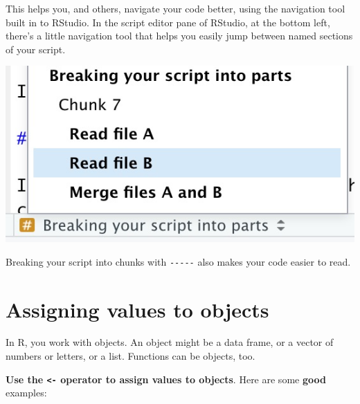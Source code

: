 \documentclass[]{book}
\newenvironment{Shaded}{\begin{snugshade}}{\end{snugshade}}
\newcommand{\KeywordTok}[1]{\textcolor[rgb]{0.13,0.29,0.53}{\textbf{#1}}}
\newcommand{\NormalTok}[1]{#1}
\newcommand{\OperatorTok}[1]{\textcolor[rgb]{0.81,0.36,0.00}{\textbf{#1}}}
\newcommand{\StringTok}[1]{\textcolor[rgb]{0.31,0.60,0.02}{#1}}
\begin{document}
This helps you, and others, navigate your code better, using the navigation tool built in to RStudio. In the script editor pane of RStudio, at the bottom left, there's a little navigation tool that helps you easily jump between named sections of your script.

\includegraphics[width=7.64in]{atlas/rstudio_navigation}

Breaking your script into chunks with \texttt{-\/-\/-\/-\/-} also makes your code easier to read.

\hypertarget{assigning-values-to-objects}{%
\section{Assigning values to objects}\label{assigning-values-to-objects}}

In R, you work with objects. An object might be a data frame, or a vector of numbers or letters, or a list. Functions can be objects, too.

\textbf{Use the \texttt{\textless{}-} operator to assign values to objects}. Here are some \textbf{good} examples:

\begin{Shaded}
\end{Shaded}
\end{document}
